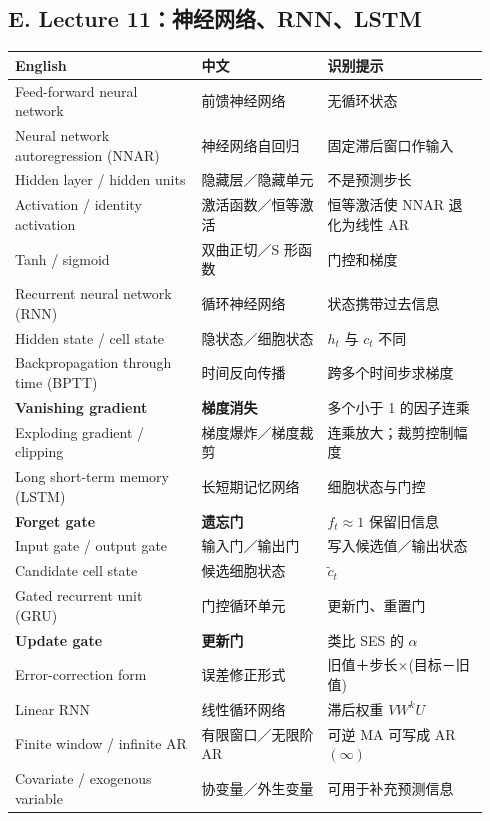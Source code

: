 \documentclass[UTF8,fontset=fandol,10.5pt,a4paper]{ctexart}
\begin{document}
\subsection*{E. Lecture 11：神经网络、RNN、LSTM}
\begin{longtable}{@{}p{0.37\linewidth}p{0.25\linewidth}p{0.32\linewidth}@{}}
\toprule English & 中文 & 识别提示\\\midrule\endhead
Feed-forward neural network & 前馈神经网络 & 无循环状态\\
Neural network autoregression (NNAR) & 神经网络自回归 & 固定滞后窗口作输入\\
Hidden layer / hidden units & 隐藏层／隐藏单元 & 不是预测步长\\
Activation / identity activation & 激活函数／恒等激活 & 恒等激活使 NNAR 退化为线性 AR\\
Tanh / sigmoid & 双曲正切／S 形函数 & 门控和梯度\\
Recurrent neural network (RNN) & 循环神经网络 & 状态携带过去信息\\
Hidden state / cell state & 隐状态／细胞状态 & $h_t$ 与 $c_t$ 不同\\
Backpropagation through time (BPTT) & 时间反向传播 & 跨多个时间步求梯度\\
\textbf{Vanishing gradient} & \textbf{梯度消失} & 多个小于 1 的因子连乘\\
Exploding gradient / clipping & 梯度爆炸／梯度裁剪 & 连乘放大；裁剪控制幅度\\
Long short-term memory (LSTM) & 长短期记忆网络 & 细胞状态与门控\\
\textbf{Forget gate} & \textbf{遗忘门} & $f_t\approx1$ 保留旧信息\\
Input gate / output gate & 输入门／输出门 & 写入候选值／输出状态\\
Candidate cell state & 候选细胞状态 & $\tilde c_t$\\
Gated recurrent unit (GRU) & 门控循环单元 & 更新门、重置门\\
\textbf{Update gate} & \textbf{更新门} & 类比 SES 的 $\alpha$\\
Error-correction form & 误差修正形式 & 旧值＋步长$\times$(目标－旧值)\\
Linear RNN & 线性循环网络 & 滞后权重 $VW^kU$\\
Finite window / infinite AR & 有限窗口／无限阶 AR & 可逆 MA 可写成 AR$(\infty)$\\
Covariate / exogenous variable & 协变量／外生变量 & 可用于补充预测信息\\
\bottomrule
\end{longtable}
\end{document}
